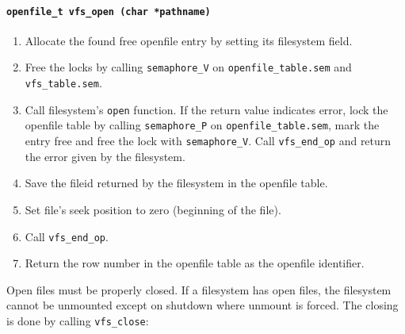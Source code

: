 \documentclass[twoside,a4paper]{report}
\makeatletter
\newenvironment{function}[3]{%
\paragraph{\texttt{#1 {\textbf{#2}} (#3)}}%
\index{#2@\texttt{#2}}%
\begin{itemize}%
}{%
\end{itemize}%
}
\makeatother
\begin{document}
\begin{function}{openfile\_t}{vfs\_open}{char *pathname}
\begin{enumerate}
\item Allocate the found free openfile entry by setting its filesystem field.

\item Free the locks by calling \texttt{semaphore\_V} on
\texttt{openfile\_table.sem} and \texttt{vfs\_table.sem}.

\item Call filesystem's \texttt{open} function. If the return value
indicates error, lock the openfile table by calling
\texttt{semaphore\_P} on \texttt{openfile\_table.sem}, mark the entry
free and free the lock with \texttt{semaphore\_V}. Call
\texttt{vfs\_end\_op} and return the error given by the filesystem.

\item Save the fileid returned by the filesystem in the openfile table.

\item Set file's seek position to zero (beginning of the file).

\item Call \texttt{vfs\_end\_op}.

\item Return the row number in the openfile table as the openfile identifier.

\end{enumerate}
\end{function}

Open files must be properly closed. If a filesystem has open files,
the filesystem cannot be unmounted except on shutdown where unmount is
forced. The closing is done by calling \texttt{vfs\_close}:
\end{document}
